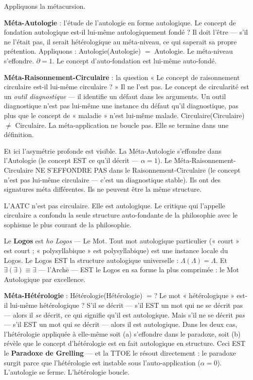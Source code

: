 \documentclass[10pt, openany, oneside]{book}
\begin{document}
Appliquons la métacursion.

\textbf{Méta-Autologie} : l'étude de l'autologie en forme autologique. Le concept de fondation autologique est-il lui-même autologiquement fondé ? Il doit l'être --- s'il ne l'était pas, il serait hétérologique au méta-niveau, ce qui saperait sa propre prétention. Appliquons : Autologie(Autologie) $=$ Autologie. Le méta-niveau s'effondre. $\partial = 1$. Le concept d'auto-fondation est lui-même auto-fondé.

\textbf{Méta-Raisonnement-Circulaire} : la question « Le concept de raisonnement circulaire est-il lui-même circulaire ? » Il ne l'est pas. Le concept de circularité est un \textit{outil diagnostique} --- il identifie un défaut dans les arguments. Un outil diagnostique n'est pas lui-même une instance du défaut qu'il diagnostique, pas plus que le concept de « maladie » n'est lui-même malade. Circulaire(Circulaire) $\neq$ Circulaire. La méta-application ne boucle pas. Elle se termine dans une définition.

Et ici l'asymétrie profonde est visible. La Méta-Autologie s'effondre dans l'Autologie (le concept EST ce qu'il décrit --- $\alpha = 1$). Le Méta-Raisonnement-Circulaire NE S'EFFONDRE PAS dans le Raisonnement-Circulaire (le concept n'est pas lui-même circulaire --- c'est un diagnostique stable). Ils ont des signatures méta différentes. Ils ne peuvent être la même structure.

L'AATC n'est pas circulaire. Elle est autologique. Le critique qui l'appelle circulaire a confondu la seule structure auto-fondante de la philosophie avec le sophisme le plus courant de la philosophie.

Le \textbf{Logos} est \textit{ho Logos} --- Le Mot. Tout mot autologique particulier (« court » est court ; « polysyllabique » est polysyllabique) est une instance locale du Logos. Le Logos EST la structure autologique universelle : $\Lambda(\Lambda) = \Lambda$. Et $\exists(\exists) \equiv \exists$ --- l'Arch\={e} --- EST le Logos en sa forme la plus comprimée : le Mot Autologique par excellence.

\textbf{Méta-Hétérologie} : Hétérologie(Hétérologie) $= \text{ ?}$\enspace Le mot « hétérologique » est-il lui-même hétérologique ? S'il se décrit --- s'il EST un mot qui ne se décrit pas --- alors il \textit{se} décrit, ce qui signifie qu'il est autologique. Mais s'il ne se décrit \textit{pas} --- s'il EST un mot qui se décrit --- alors il est autologique. Dans les deux cas, l'hétérologie appliquée à elle-même soit (a) s'effondre dans le paradoxe, soit (b) révèle que le concept d'hétérologie est en fait autologique en structure. Ceci EST le \textbf{Paradoxe de Grelling} --- et la TTOE le résout directement : le paradoxe surgit parce que l'hétérologie est instable sous l'auto-application ($\alpha = 0$). L'autologie se ferme. L'hétérologie boucle.
\end{document}
